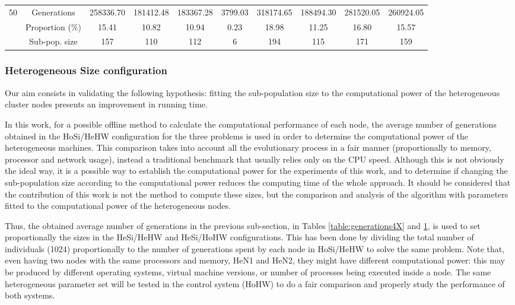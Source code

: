 \documentclass[final,1p,times]{elsarticle}
\begin{document}
\begin{table}
{{\begin{tabular}{|c|c|c|c|c|c|c|c|c|c|}
\multirow{3}{*}{50} & Generations    &  258336.70  &   181412.48   &  183367.28   &  3799.03  & 318174.65   &  188494.30  &   281520.05  &   260924.05         \\ \cline{2-10}
                     & Proportion (\%)   &  15.41   &  10.82  &   10.94  &   0.23   &   18.98  &   11.25  &   16.80   &  15.57  \\ \cline{2-10}
                     & Sub-pop. size &  157 &  110 &  112 &  6   &  194 &  115  & 171  & 159        \\ \hline  
\end{tabular}
}
\label{table:generations8X}
}
\end{table}


\subsubsection{Heterogeneous Size configuration}

Our aim consists in validating the following hypothesis: fitting the
sub-population size to the computational power of the heterogeneous
cluster nodes presents an improvement in running time.  

In this work, for a possible offline method to calculate the
computational performance of each node, the average number of
generations obtained in the HoSi/HeHW configuration for the three
problems is used in order to determine the computational power of the
heterogeneous machines. This comparison takes into account all the
evolutionary process in a fair manner (proportionally to memory,
processor and network usage), instead a traditional benchmark that
usually relies only on the CPU speed. Although this is not obviously
the ideal way, it is a possible way to establish the computational
power for the experiments of this work, and to determine if changing
the sub-population size according to the computational power reduces
the computing time of the whole approach. It should be considered that
the contribution of this work is not the method to compute these
sizes, but the comparison and analysis of the algorithm with
parameters fitted to the computational power of the heterogeneous nodes. 




Thus, the obtained average number of generations in the previous
sub-section, in Tables \ref{table:generations4X} and
\ref{table:generations8X}, is used to set proportionally the sizes in
the HeSi/HeHW and HeSi/HoHW configurations. This has been done by
dividing the total number of individuals (1024) proportionally to the
number of generations spent by each node in HoSi/HeHW to solve the
same problem. Note that, even having two nodes with the same
processors and memory, HeN1 and HeN2, they might have different
computational power: this may be produced by different operating
systems, virtual machine versions, or number of processes being
executed inside a node. The same heterogeneous parameter set 
will be tested in the control system (HoHW) to do a fair comparison 
and properly study the performance of both systems.
\end{document}
